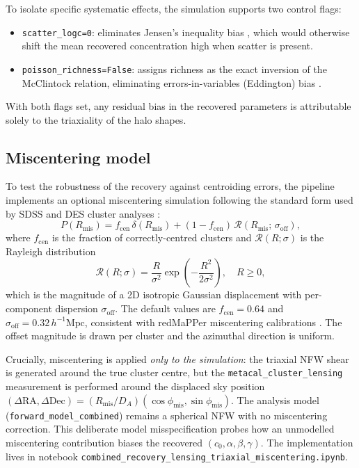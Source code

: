 \documentclass[12pt,a4paper]{article}
\begin{document}
To isolate specific systematic effects, the simulation supports two control flags:
\begin{itemize}
  \item \texttt{scatter\_logc=0}: eliminates Jensen's inequality bias \citep{Jensen1906},
    which would otherwise shift the mean recovered concentration high when scatter is
    present.
  \item \texttt{poisson\_richness=False}: assigns richness as the exact
    inversion of the McClintock relation, eliminating errors-in-variables (Eddington)
    bias \citep{Eddington1913}.
\end{itemize}
With both flags set, any residual bias in the recovered parameters is attributable
solely to the triaxiality of the halo shapes.

\subsection{Miscentering model}
\label{sec:miscentering}

To test the robustness of the recovery against centroiding errors, the pipeline
implements an optional miscentering simulation following the standard form used
by SDSS and DES cluster analyses \citep{Johnston2007,Rykoff2016,McClintock2019}:
\begin{equation}
  P(R_\mathrm{mis}) =
    f_\mathrm{cen}\,\delta(R_\mathrm{mis}) +
    (1-f_\mathrm{cen})\,\mathcal{R}(R_\mathrm{mis};\,\sigma_\mathrm{off}),
  \label{eq:mis_model}
\end{equation}
where $f_\mathrm{cen}$ is the fraction of correctly-centred clusters and
$\mathcal{R}(R;\sigma)$ is the Rayleigh distribution
\begin{equation}
  \mathcal{R}(R;\sigma) = \frac{R}{\sigma^2}\exp\!\left(-\frac{R^2}{2\sigma^2}\right),
  \quad R\ge 0,
\end{equation}
which is the magnitude of a 2D isotropic Gaussian displacement with per-component
dispersion $\sigma_\mathrm{off}$.  The default values are $f_\mathrm{cen}=0.64$
and $\sigma_\mathrm{off}=0.32\,h^{-1}\mathrm{Mpc}$, consistent with redMaPPer
miscentering calibrations \citep{Rykoff2016,Zhang2019}.  The offset magnitude is
drawn per cluster and the azimuthal direction is uniform.

Crucially, miscentering is applied \emph{only to the simulation}: the triaxial
NFW shear is generated around the true cluster centre, but the
\texttt{metacal\_cluster\_lensing} measurement is performed around the displaced
sky position $(\Delta\mathrm{RA}, \Delta\mathrm{Dec}) = (R_\mathrm{mis}/D_A)
(\cos\phi_\mathrm{mis}, \sin\phi_\mathrm{mis})$.  The analysis model
(\texttt{forward\_model\_combined}) remains a spherical NFW with no miscentering
correction.  This deliberate model misspecification probes how an unmodelled
miscentering contribution biases the recovered $(c_0, \alpha, \beta, \gamma)$.
The implementation lives in notebook
\texttt{combined\_recovery\_lensing\_triaxial\_miscentering.ipynb}.
\end{document}

